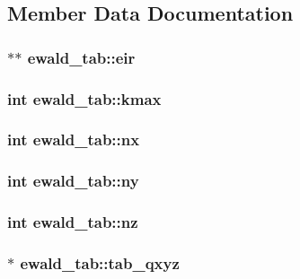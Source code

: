\subsection{\-Member \-Data \-Documentation}
\hypertarget{structewald__tab_a70d0db67a818ff937d6fd2d0b3a90852}{
\subsubsection[{eir}]{$\ast$$\ast$ {\bf ewald\-\_\-tab\-::eir}}}\label{structewald__tab_a70d0db67a818ff937d6fd2d0b3a90852}
\hypertarget{structewald__tab_abe4ea2cc543abf8727ae22511281e8f7}{
\subsubsection[{kmax}]{\setlength{\rightskip}{0pt plus 5cm}int {\bf ewald\-\_\-tab\-::kmax}}}\label{structewald__tab_abe4ea2cc543abf8727ae22511281e8f7}
\hypertarget{structewald__tab_add3c79cda0e8f8d797541cd0d8c63590}{
\subsubsection[{nx}]{\setlength{\rightskip}{0pt plus 5cm}int {\bf ewald\-\_\-tab\-::nx}}}\label{structewald__tab_add3c79cda0e8f8d797541cd0d8c63590}
\hypertarget{structewald__tab_a863851f7e8c22d7639d853a8224c3193}{
\subsubsection[{ny}]{\setlength{\rightskip}{0pt plus 5cm}int {\bf ewald\-\_\-tab\-::ny}}}\label{structewald__tab_a863851f7e8c22d7639d853a8224c3193}
\hypertarget{structewald__tab_adbd9ada957d5e103fb5025ce50eab1eb}{
\subsubsection[{nz}]{\setlength{\rightskip}{0pt plus 5cm}int {\bf ewald\-\_\-tab\-::nz}}}\label{structewald__tab_adbd9ada957d5e103fb5025ce50eab1eb}
\hypertarget{structewald__tab_abd819f9fd566c9352a07448ead17155d}{
\subsubsection[{tab\-\_\-qxyz}]{ $\ast$ {\bf ewald\-\_\-tab\-::tab\-\_\-qxyz}}}\label{structewald__tab_abd819f9fd566c9352a07448ead17155d}
